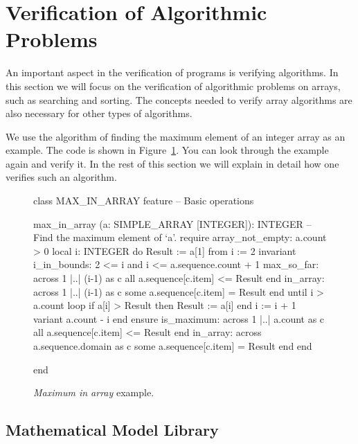 \newpage
\section{Verification of Algorithmic Problems}

An important aspect in the verification of programs is verifying algorithms. In this section we will focus on the verification of algorithmic problems on arrays, such as searching and sorting. The concepts needed to verify array algorithms are also necessary for other types of algorithms.

We use the algorithm of finding the maximum element of an integer array as an example. The code is shown in Figure~\ref{code:max_in_array}. You can look through the example again and verify it. In the rest of this section we will explain in detail how one verifies such an algorithm.

\begin{figure}[!h]
\begin{adjustwidth}{-10pt}{-10pt}
\begin{erunning}[basicstyle=\footnotesize,numbers=left]
class MAX_IN_ARRAY
feature -- Basic operations

	max_in_array (a: SIMPLE_ARRAY [INTEGER]): INTEGER
			-- Find the maximum element of `a'.
		require
			array_not_empty: a.count > 0
		local 
			i: INTEGER
		do
			Result := a[1]
			from
				i := 2
			invariant
				i_in_bounds: 2 <= i and i <= a.sequence.count + 1
				max_so_far: across 1 |..| (i-1) as c all a.sequence[c.item] <= Result end
				in_array: across 1 |..| (i-1) as c some a.sequence[c.item] = Result end
			until
				i > a.count
			loop
				if a[i] > Result then
					Result := a[i]
				end
				i := i + 1
			variant
				a.count - i
			end
		ensure
			is_maximum: across 1 |..| a.count as c all a.sequence[c.item] <= Result end
			in_array: across a.sequence.domain as c some a.sequence[c.item] = Result end
		end

end
\end{erunning}
\end{adjustwidth}
\caption{\emph{Maximum in array} example.}
\label{code:max_in_array}
\end{figure}

\subsection{Mathematical Model Library} \label{sec:mml}

